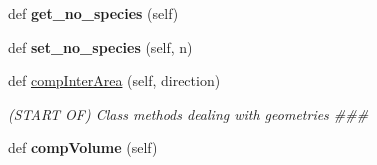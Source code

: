 \begin{DoxyCompactItemize}
\item 
def {\bfseries get\+\_\+no\+\_\+species} (self)\hypertarget{classmesh_1_1Mesh_adf05f4be209e9171d147e66763b3f206}{}\label{classmesh_1_1Mesh_adf05f4be209e9171d147e66763b3f206}

\item 
def {\bfseries set\+\_\+no\+\_\+species} (self, n)\hypertarget{classmesh_1_1Mesh_a65d4a784781429cff8e3d20d3741c63f}{}\label{classmesh_1_1Mesh_a65d4a784781429cff8e3d20d3741c63f}

\item 
def \hyperlink{classmesh_1_1Mesh_a5d79b848ed97ec98bd97f92ed7989c66}{comp\+Inter\+Area} (self, direction)
\begin{DoxyCompactList}\small\item\em (S\+T\+A\+RT OF) Class methods dealing with geometries \#\#\# \end{DoxyCompactList}\item 
def {\bfseries comp\+Volume} (self)\hypertarget{classmesh_1_1Mesh_ab045aecb3cc2168b185060f7b59f3b6d}{}\label{classmesh_1_1Mesh_ab045aecb3cc2168b185060f7b59f3b6d}

\end{DoxyCompactItemize}
